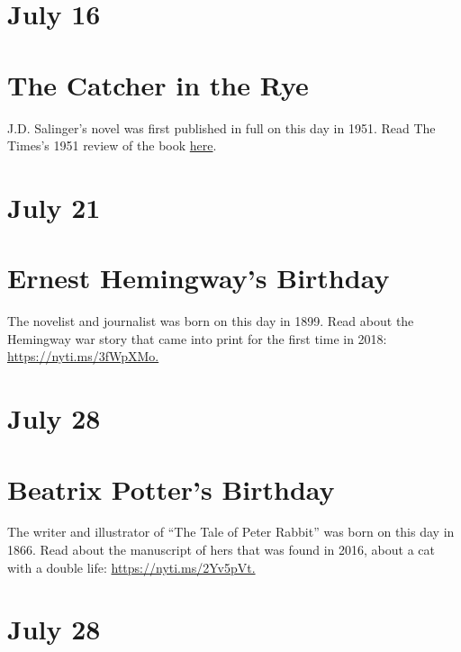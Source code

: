\hypertarget{july-16-1}{%
\section{July 16}\label{july-16-1}}

\hypertarget{the-catcher-in-the-rye-1}{%
\section{The Catcher in the Rye}\label{the-catcher-in-the-rye-1}}

J.D. Salinger's novel was first published in full on this day in 1951.
Read The Times's 1951 review of the book
\href{https://nyti.ms/31esNIk?smid=bookscal}{here}.

\hypertarget{july-21}{%
\section{July 21}\label{july-21}}

\hypertarget{ernest-hemingways-birthday}{%
\section{Ernest Hemingway's Birthday}\label{ernest-hemingways-birthday}}

The novelist and journalist was born on this day in 1899. Read about the
Hemingway war story that came into print for the first time in 2018:
\href{https://nyti.ms/3fWpXMo?smid=bookscal}{https://nyti.ms/3fWpXMo.}

\hypertarget{july-28}{%
\section{July 28}\label{july-28}}

\hypertarget{beatrix-potters-birthday}{%
\section{Beatrix Potter's Birthday}\label{beatrix-potters-birthday}}

The writer and illustrator of ``The Tale of Peter Rabbit'' was born on
this day in 1866. Read about the manuscript of hers that was found in
2016, about a cat with a double life:
\href{https://nyti.ms/2Yv5pVt?smid=bookscal}{https://nyti.ms/2Yv5pVt.}

\hypertarget{july-28-1}{%
\section{July 28}\label{july-28-1}}

